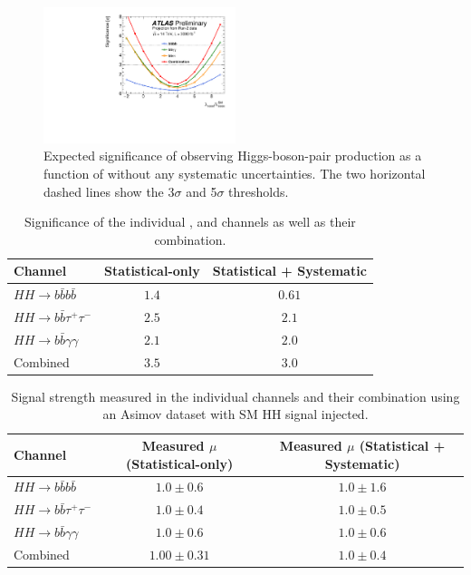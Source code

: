 \begin{figure}[htbp]
    \centering
    \includegraphics[width=0.5\textwidth]{Ch6/Img/figures_combination_bbbb_bbtt_bbyy_NoSyst_Significance_Preliminary.pdf}
    \caption{Expected significance of observing Higgs-boson-pair production as a function of \kl without any systematic uncertainties.  The two horizontal dashed lines show the 3$\sigma$ and 5$\sigma$ thresholds.} 
    \label{fig:HL-LHC:Comb:sig}
\end{figure}

\begin{table}[htbp]
    \centering
    \begin{tabular}{lcc}
\hline \hline
Channel & Statistical-only & Statistical + Systematic \\
\hline
$H H \rightarrow b \bar{b} b \bar{b}$ & $1.4$ & $0.61$ \\
$H H \rightarrow b \bar{b} \tau^{+} \tau^{-}$ & $2.5$ & $2.1$ \\
$H H \rightarrow b \bar{b} \gamma \gamma$ & $2.1$ & $2.0$ \\
\hline Combined & $3.5$ & $3.0$ \\
\hline \hline
\end{tabular}
    \caption{Significance of the individual \bbbb, \bbtt and \bbyy channels as well as their combination.}
    \label{tab:HL-LHC:Comb:sig}
\end{table}

\begin{table}[htbp]
    \centering
    \begin{tabular}{lcc}
\hline \hline 
Channel & Measured $\mu$ (Statistical-only) & Measured $\mu$ (Statistical + Systematic) \\
\hline
$H H \rightarrow b \bar{b} b \bar{b}$ & $1.0 \pm 0.6$ & $1.0 \pm 1.6$ \\
$H H \rightarrow b \bar{b} \tau^{+} \tau^{-}$ & $1.0 \pm 0.4$ & $1.0 \pm 0.5$ \\
$H H \rightarrow b \bar{b} \gamma \gamma$ & $1.0 \pm 0.6$ & $1.0 \pm 0.6$ \\
\hline Combined & $1.00 \pm 0.31$ & $1.0 \pm 0.4$ \\
\hline \hline
\end{tabular}
    \caption{Signal strength measured in the individual channels and their combination using an Asimov dataset with SM HH signal injected.}
    \label{tab:tab:HL-LHC:Comb:mu}
\end{table}

